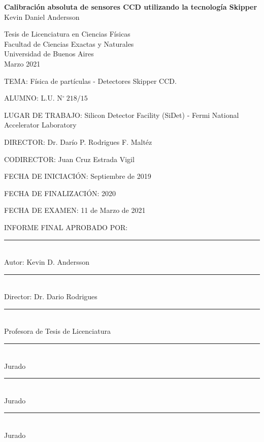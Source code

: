 \documentclass[a4paper,12pt]{report}
\begin{document}
\begin{titlepage}
    \begin{center}
    \doublespacing

    \vspace*{150pt}
    \textbf{Calibración absoluta de sensores CCD utilizando la tecnología Skipper}\\

    \vspace*{20pt}
    Kevin Daniel Andersson

    \vspace{230pt}
    Tesis de Licenciatura en Ciencias Físicas\\Facultad de Ciencias Exactas y Naturales\\Universidad de Buenos Aires\\\vspace{30pt}Marzo 2021
    \end{center}

\newpage
\thispagestyle{empty} \mbox{}
\thispagestyle{empty}
\end{titlepage}


\thispagestyle{empty}
TEMA: Física de partículas - Detectores Skipper CCD.

ALUMNO: L.U. N$^\circ\ 218/15$

LUGAR DE TRABAJO: Silicon Detector Facility (SiDet) - Fermi National Accelerator Laboratory

DIRECTOR: Dr. Darío P. Rodrigues F. Maltéz

CODIRECTOR: Juan Cruz Estrada Vigil

FECHA DE INICIACIÓN: Septiembre de 2019

FECHA DE FINALIZACIÓN:  2020 

FECHA DE EXAMEN:  11 de Marzo de 2021

INFORME FINAL APROBADO POR:
\vfill
\begin{multicols}{2}    
\rule[0pt]{2.5in}{0.5pt}\\
Autor: Kevin D. Andersson
\vspace{3em}

\rule[0pt]{2.5in}{0.5pt}\\
Director: Dr. Dario Rodrigues
\vspace{3em}
   
\rule[0pt]{2.5in}{0.5pt}\\
Profesora de Tesis de Licenciatura
    
\columnbreak
\rule[0pt]{2.5in}{0.5pt}\\
Jurado 
\vspace{3em}
    
\rule[0pt]{2.5in}{0.5pt}\\
Jurado 
\vspace{3em}
    
\rule[0pt]{2.5in}{0.5pt}\\
Jurado 
\end{multicols}  
\newpage
\thispagestyle{empty} \mbox{}
\thispagestyle{empty}
\end{document}
